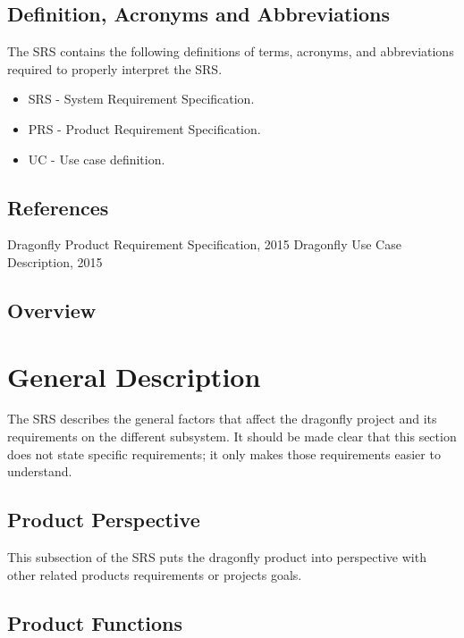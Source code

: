 \documentclass[a4paper]{article}
\begin{document}
\subsection{Definition, Acronyms and Abbreviations}

The SRS contains the following definitions of terms, acronyms, and abbreviations required to properly interpret the SRS.
\begin{itemize}
	\item SRS - System Requirement Specification.
	\item PRS - Product Requirement Specification. 
	\item UC  - Use case definition.
\end{itemize}

\subsection{References}

\begin{thebibliography}{99}
	 Dragonfly Product Requirement Specification, 2015
	 Dragonfly Use Case Description, 2015
\end{thebibliography}

\subsection{Overview}

\section{General Description}

The SRS describes the general factors that affect the dragonfly project and its requirements on the different subsystem. It should be made clear that this section does not state specific requirements; it only makes those requirements easier to understand.

\subsection{Product Perspective}

This subsection of the SRS puts the dragonfly product into perspective with other related products requirements or projects goals. 

\subsection{Product Functions}
\end{document}
